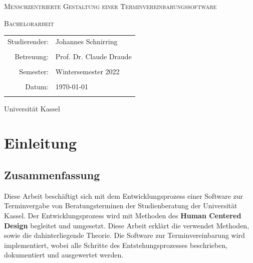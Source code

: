 \documentclass[12pt]{article}
\title{\thesisTitle}
\author{Johannes Schnirring}
\newcommand{\thesisTitle}{Menschzentrierte Gestaltung einer Terminvereinbarungssoftware}
\begin{document}
\begin{titlepage}
    \centering
    {\scshape\LARGE \thesisTitle \par}
    \vspace{1cm}

    {\scshape\Large Bachelorarbeit\par}
    \vspace{1.5cm}

    \begin{tabular}{r l}
        {\Large Studierender:} & {\Large Johannes Schnirring}             \\ \\
        {\Large Betreuung:}    & {\Large Prof. Dr. Claude Draude        } \\ \\
        {\Large Semester:}     & {\Large Wintersemester 2022}             \\ \\
        {\Large Datum:}        & {\Large \today}                          \\ \\
    \end{tabular}
    \vfill
    {\large Universität Kassel}


\end{titlepage}

\tableofcontents
\newpage

\section{Einleitung}

\subsection{Zusammenfassung}

Diese Arbeit beschäftigt sich mit dem Entwicklungsprozess einer Software zur
Terminvergabe von Beratungsterminen der Studienberatung der Universität Kassel.
Der Entwicklungsprozess wird mit Methoden des \textbf{Human Centered Design}
begleitet und umgesetzt. Diese Arbeit erklärt die verwendet Methoden, sowie die
dahinterliegende Theorie. Die Software zur Terminvereinbarung wird
implementiert, wobei alle Schritte des Entstehungsprozesses beschrieben,
dokumentiert und ausgewertet werden.
\end{document}
